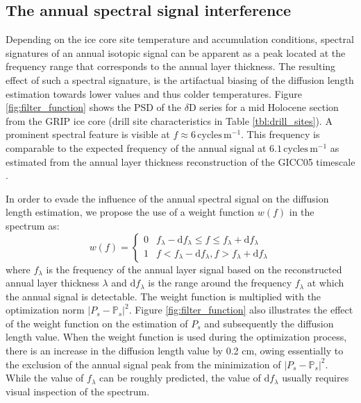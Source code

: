 \documentclass[11pt, draftcls, onecolumn]{IEEEtran} %
\numberwithin{equation}{section}
\numberwithin{table}{section}
\numberwithin{figure}{section}
\begin{document}
\subsection*{The annual spectral signal interference}
Depending on the ice core site temperature and accumulation conditions, spectral signatures of an annual isotopic signal can be apparent
as a peak located at the frequency range that corresponds to the annual layer thickness.
The resulting effect of such a spectral signature, is the artifactual biasing of the diffusion length estimation 
towards lower values and thus colder temperatures.
Figure \ref{fig:filter_function} shows the PSD of the $\delta$D series for a mid Holocene section from the GRIP ice core
(drill site characteristics in Table \ref{tbl:drill_sites}). 
A prominent spectral feature  is visible at  $f\approx6 \,\mathrm{cycles\,m^{-1}}$. This frequency is comparable to the 
expected frequency of the annual signal at $6.1\,\mathrm{cycles\,m^{-1}}$ as estimated from the annual layer thickness reconstruction 
of the GICC05 timescale \citep{Vinther2006}.


In order to evade the influence of the annual spectral signal on the diffusion length estimation, we propose the use of a weight 
function $w(f)$ in the spectrum as:
\begin{equation}\label{eq:weight_function}
w(f)= \left\{
\begin{array}{ll}
0 &  f_{\lambda} - \mathrm{d}f_{\lambda} \leq f \leq
f_{\lambda} + \mathrm{d}f_{\lambda}\\ 
1                           &    f<f_{\lambda} - \mathrm{d}f_{\lambda}, f>f_{\lambda} + \mathrm{d}f_{\lambda}
\end{array} \right. {}
\end{equation}
where $f_\lambda$ is the frequency of the annual layer signal based on the reconstructed 
annual layer thickness $\lambda$ and $\mathrm{d}f_{\lambda}$ is the range around the frequency $f_{\lambda}$
at which the annual signal is detectable.
The weight function is multiplied with the optimization norm $\vert P_s - \mathbb{P}_s \vert^2$.
Figure \ref{fig:filter_function} also illustrates the effect of the weight function on the estimation of $P_s$ and subsequently 
the diffusion length value. When the weight function is used during the optimization process, there is an increase in the
diffusion length value by 0.2 cm, owing essentially to the exclusion of the annual signal peak from the minimization 
of $\vert P_s - \mathbb{P}_s \vert^2$.
While the value of $f_{\lambda}$ can be roughly predicted, the value of $\mathrm{d}f_{\lambda}$ usually requires visual 
inspection of the spectrum. 
\end{document}
